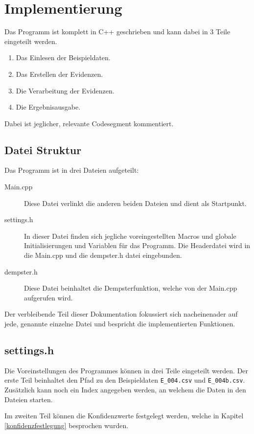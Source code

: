 \chapter{Implementierung}
Das Programm ist komplett in C++ geschrieben und kann dabei in 3 Teile eingeteilt werden.

\begin{enumerate}
  \item Das Einlesen der Beispieldaten. 
  \item Das Erstellen der Evidenzen.
  \item Die Verarbeitung der Evidenzen.
  \item Die Ergebnisausgabe.
\end{enumerate}

Dabei ist jeglicher, relevante Codesegment kommentiert.

\section{Datei Struktur}
Das Programm ist in drei Dateien aufgeteilt:

\begin{description}
  \item [Main.cpp] Diese Datei verlinkt die anderen beiden Dateien und dient als Startpunkt. 
  \item [settings.h] In dieser Datei finden sich jegliche voreingestellten Macros und globale Initialisierungen und Variablen für das Programm. Die Headerdatei wird in die Main.cpp und die dempster.h datei eingebunden.
  \item [dempster.h] Diese Datei beinhaltet die Dempsterfunktion, welche von der Main.cpp aufgerufen wird.
  \end{description}

 Der verbleibende Teil dieser Dokumentation fokussiert sich nacheinenader auf jede, genannte einzelne Datei und bespricht die implementierten Funktionen.

\section{settings.h}
Die Voreinstellungen des Programmes können in drei Teile eingeteilt werden.
Der erste Teil beinhaltet den Pfad zu den Beispieldaten \verb|E_004.csv| und \verb|E_004b.csv|. Zusätzlich kann noch ein Index angegeben werden, an welchem die Daten in den Dateien starten.

Im zweiten Teil können die Konfidenzwerte festgelegt werden, welche in Kapitel \ref{konfidenzfestlegung} besprochen wurden.

